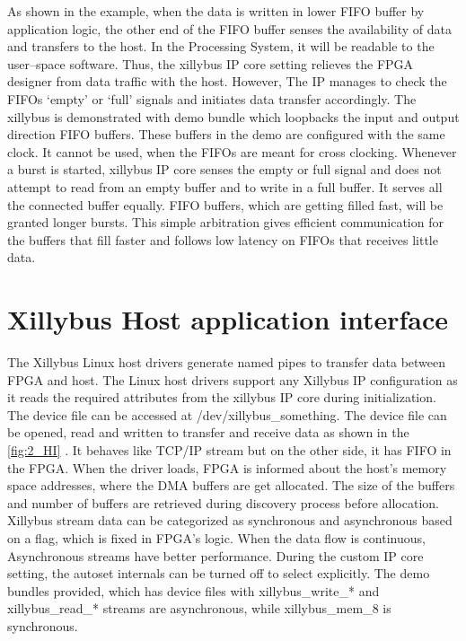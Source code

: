 As shown in the example, when the data is written in lower FIFO buffer by application logic, the other end of the FIFO buffer senses the availability of data and transfers to the host. In the Processing System, it will be readable to the user--space software. Thus, the xillybus IP core setting relieves the FPGA designer from data traffic with the host. However, The IP manages to check the FIFOs ‘empty’ or ‘full’ signals and initiates data transfer accordingly. The xillybus is demonstrated with demo bundle which loopbacks the input and output direction FIFO buffers. These buffers in the demo are configured with the same clock. It cannot be used, when the FIFOs are meant for cross clocking. Whenever a burst is started, xillybus IP core senses the empty or full signal and does not attempt to read from an empty buffer and to write in a full buffer. It serves all the connected buffer equally. FIFO buffers, which are getting filled fast, will be granted longer bursts. This simple arbitration gives efficient communication for the buffers that fill faster and follows low latency on FIFOs that receives little data.

\section{Xillybus Host application interface}

The Xillybus Linux host drivers generate named pipes to transfer data between FPGA and host. The Linux host drivers support any Xillybus IP configuration as it reads the required attributes from the xillybus IP core during initialization. The device file can be accessed at /dev/xillybus\_something. The device file can be opened, read and written to transfer and receive data as shown in the \ref{fig:2_HI} \cite{23}. It behaves like TCP/IP stream but on the other side, it has FIFO in the FPGA. When the driver loads, FPGA is informed about the host's memory space addresses, where the DMA buffers are get allocated. The size of the buffers and number of buffers are retrieved during discovery process before allocation. Xillybus stream data can be categorized as synchronous and asynchronous based on a flag, which is fixed in FPGA’s logic. When the data flow is continuous, Asynchronous streams have better performance. During the custom IP core setting, the autoset internals can be turned off to select explicitly. The demo bundles provided, which has device files with xillybus\_write\_* and xillybus\_read\_* streams are asynchronous, while xillybus\_mem\_8 is synchronous.


